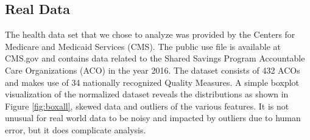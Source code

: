 \documentclass[conference]{IEEEtran}
\begin{document}

\subsection{Real Data}

The health data set that we chose to analyze was provided by the Centers for Medicare and Medicaid Services (CMS). The public use file is available at CMS.gov and contains data related to the Shared Savings Program Accountable Care Organizations (ACO) in the year 2016. The dataset consists of 432 ACOs and makes use of 34 nationally recognized Quality Measures.  A simple boxplot visualization of the normalized dataset reveals the distributions as shown in Figure \ref{fig:boxall}, skewed data and outliers of the various features. It is not unusual for real world data to be noisy and impacted by outliers due to human error, but it does complicate analysis.\\
\end{document}
